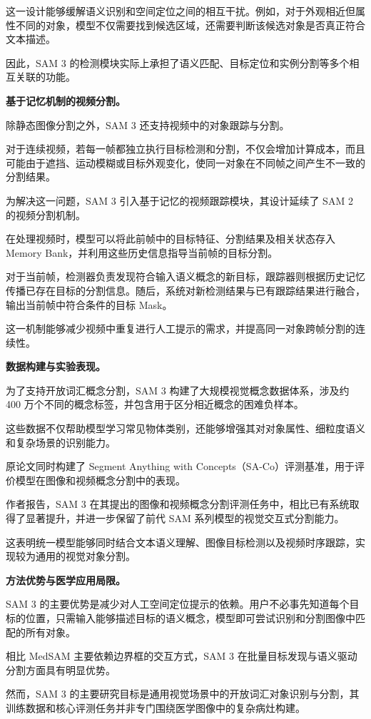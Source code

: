 \documentclass[10.5pt,compsoc]{CjC}
\theoremstyle{mystyle}
\begin{document}
这一设计能够缓解语义识别和空间定位之间的相互干扰。例如，对于外观相近但属性不同的对象，模型不仅需要找到候选区域，还需要判断该候选对象是否真正符合文本描述。

因此，SAM 3 的检测模块实际上承担了语义匹配、目标定位和实例分割等多个相互关联的功能。

\noindent\textbf{基于记忆机制的视频分割。}

除静态图像分割之外，SAM 3 还支持视频中的对象跟踪与分割。

对于连续视频，若每一帧都独立执行目标检测和分割，不仅会增加计算成本，而且可能由于遮挡、运动模糊或目标外观变化，使同一对象在不同帧之间产生不一致的分割结果。

为解决这一问题，SAM 3 引入基于记忆的视频跟踪模块，其设计延续了 SAM 2 的视频分割机制。

在处理视频时，模型可以将此前帧中的目标特征、分割结果及相关状态存入 Memory Bank，并利用这些历史信息指导当前帧的目标分割。

对于当前帧，检测器负责发现符合输入语义概念的新目标，跟踪器则根据历史记忆传播已存在目标的分割信息。随后，系统对新检测结果与已有跟踪结果进行融合，输出当前帧中符合条件的目标 Mask。

这一机制能够减少视频中重复进行人工提示的需求，并提高同一对象跨帧分割的连续性。

\noindent\textbf{数据构建与实验表现。}

为了支持开放词汇概念分割，SAM 3 构建了大规模视觉概念数据体系，涉及约 400 万个不同的概念标签，并包含用于区分相近概念的困难负样本。

这些数据不仅帮助模型学习常见物体类别，还能够增强其对对象属性、细粒度语义和复杂场景的识别能力。

原论文同时构建了 Segment Anything with Concepts（SA-Co）评测基准，用于评价模型在图像和视频概念分割中的表现。

作者报告，SAM 3 在其提出的图像和视频概念分割评测任务中，相比已有系统取得了显著提升，并进一步保留了前代 SAM 系列模型的视觉交互式分割能力。

这表明统一模型能够同时结合文本语义理解、图像目标检测以及视频时序跟踪，实现较为通用的视觉对象分割。

\noindent\textbf{方法优势与医学应用局限。}

SAM 3 的主要优势是减少对人工空间定位提示的依赖。用户不必事先知道每个目标的位置，只需输入能够描述目标的语义概念，模型即可尝试识别和分割图像中匹配的所有对象。

相比 MedSAM 主要依赖边界框的交互方式，SAM 3 在批量目标发现与语义驱动分割方面具有明显优势。

然而，SAM 3 的主要研究目标是通用视觉场景中的开放词汇对象识别与分割，其训练数据和核心评测任务并非专门围绕医学图像中的复杂病灶构建。
\end{document}
